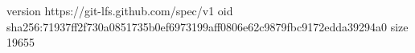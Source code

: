 version https://git-lfs.github.com/spec/v1
oid sha256:71937ff2f730a0851735b0ef6973199aff0806e62c9879fbc9172edda39294a0
size 19655
